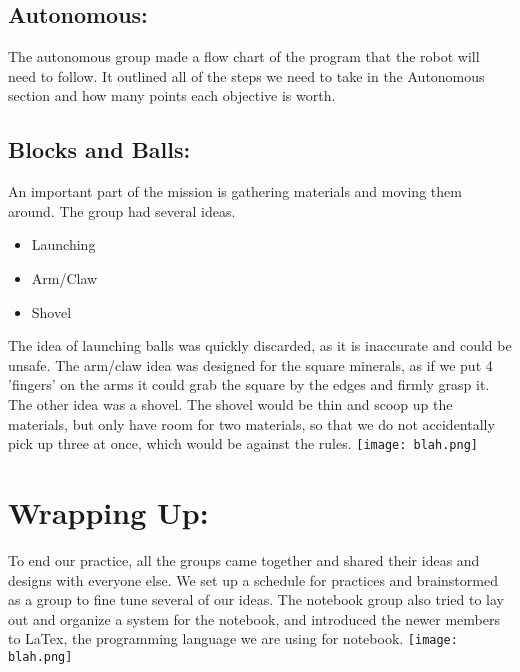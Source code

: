 \documentclass[12pt]{article}
\begin{document}
\subsection{Autonomous:}
The autonomous group made a flow chart of the program that the robot will need to follow. It outlined all of the steps we need to take in the Autonomous section and how many points each objective is worth.

\subsection{Blocks and Balls:}
An important part of the mission is gathering materials and moving them around. The group had several ideas.
\begin{itemize}
	\item Launching 
	\item Arm/Claw
	\item Shovel
\end{itemize}
The idea of launching balls was quickly discarded, as it is inaccurate and could be unsafe. The arm/claw idea was designed for the square minerals, as if we put 4 'fingers' on the arms it could grab the square by the edges and firmly grasp it. The other idea was a shovel. The shovel would be thin and scoop up the materials, but only have room for two materials, so that we do not accidentally pick up three at once, which would be against the rules.
\texttt{[image: blah.png]}%

\section{Wrapping Up:}
To end our practice, all the groups came together and shared their ideas and designs with everyone else. We set up a schedule for practices and brainstormed as a group to fine tune several of our ideas. The notebook group also tried to lay out and organize a system for the notebook, and introduced the newer members to LaTex, the programming language we are using for notebook.
\texttt{[image: blah.png]}%
\end{document}
